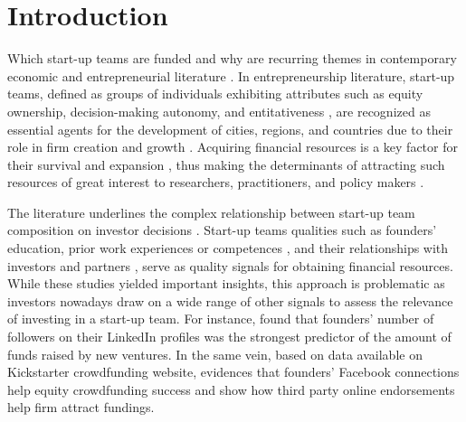 \documentclass[12pt]{article}
\begin{document}
\section{Introduction}

Which start-up teams are funded and why are recurring themes in contemporary economic and entrepreneurial literature \citep{baum2004picking, beckman2007early, bernstein2017attracting, franke2006you, franke2008venture, kaplan2009should, plummer2016better, shane2002network}. In entrepreneurship literature, start-up teams, defined as groups of individuals exhibiting attributes such as equity ownership, decision-making autonomy, and entitativeness \citep{knight2020start}, are recognized as essential agents for the development of cities, regions, and countries due to their role in firm creation and growth \citep{audretsch2001linking, autio2016entrepreneurship}. Acquiring financial resources is a key factor for their survival and expansion \citep{rosenbusch2013does}, thus making the determinants of attracting such resources of great interest to researchers, practitioners, and policy makers \citep{EUcommission2015digital}.

The literature underlines the complex relationship between start-up team composition on investor decisions \citep{ghassemiautomated, klotz2014new}. Start-up teams qualities such as founders' education, prior work experiences or competences \citep{errico2023source, shane2002network, hsu2007experienced}, and their relationships with investors and partners \citep{huang2017resources}, serve as quality signals for obtaining financial resources. While these studies yielded important insights, this approach is problematic as investors nowadays draw on a wide range of other signals to assess the relevance of investing in a start-up team. For instance, \citet{banerji2019startup} found that founders' number of followers on their LinkedIn profiles was the strongest predictor of the amount of funds raised by new ventures. In the same vein, based on data available on Kickstarter crowdfunding website, \citet{mollick2014dynamics} evidences that founders' Facebook connections help equity crowdfunding success and \citet{courtney2017resolving} show how third party online endorsements help firm attract fundings.
\end{document}
